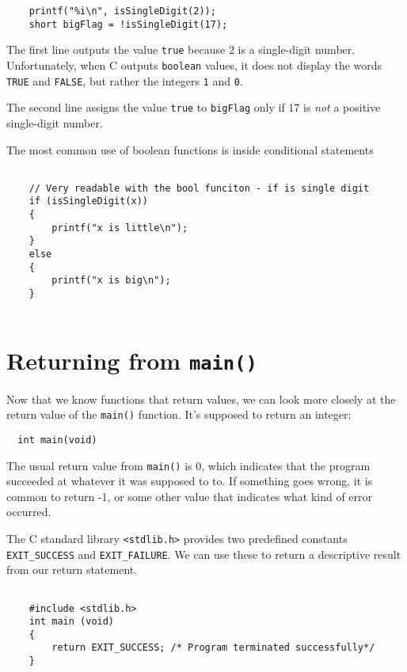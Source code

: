 \begin{verbatim}
    printf("%i\n", isSingleDigit(2));
    short bigFlag = !isSingleDigit(17);
\end{verbatim}
%
The first line outputs the value {\tt true} because 2 is a
single-digit number.  Unfortunately, when C outputs {\tt boolean} values, it
does not display the words {\tt TRUE} and {\tt FALSE}, but rather the
integers {\tt 1} and {\tt 0}.

The second line assigns the value {\tt true} to {\tt bigFlag}
only if 17 is {\em not} a positive single-digit number.

The most common use of boolean functions is inside conditional
statements

\begin{verbatim}

    // Very readable with the bool funciton - if is single digit
    if (isSingleDigit(x))  
    {
        printf("x is little\n");
    } 
    else 
    {
        printf("x is big\n");
    }
    
\end{verbatim}

\section {Returning from {\tt main()}}

Now that we know functions that return values, we can look more closely at the 
return value of the {\tt main()} function.
It's supposed to return an integer:

\begin{verbatim}
  int main(void)
\end{verbatim}

The usual return value from {\tt main()} is 0, which indicates that
the program succeeded at whatever it was supposed to to.  If something
goes wrong, it is common to return -1, or some other value that
indicates what kind of error occurred.


The C standard library \texttt{<stdlib.h>} provides two predefined constants {\tt EXIT\_SUCCESS} and {\tt EXIT\_FAILURE}.
We can use these to return a descriptive result from our return statement. 


\begin{verbatim}

    #include <stdlib.h>
    int main (void)
    {
        return EXIT_SUCCESS; /* Program terminated successfully*/
    }
    
\end{verbatim}
%


